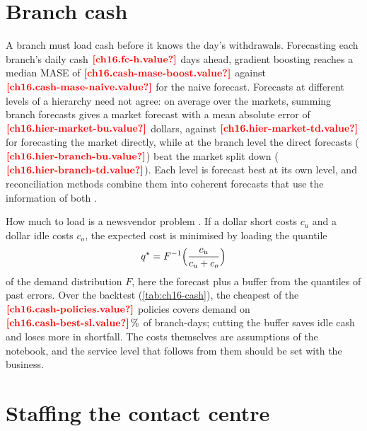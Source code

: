 \section{Branch cash}\label{sec:op-cash}

A branch must load cash before it knows the day's withdrawals. Forecasting each branch's daily cash $\est{ch16.fc-h}{value}$ days ahead,
gradient boosting reaches a median MASE of $\est{ch16.cash-mase-boost}{value}$ against $\est{ch16.cash-mase-naive}{value}$ for
the naive forecast. Forecasts at different levels of a hierarchy need not agree: on average over the markets, summing branch forecasts gives a market forecast with a mean absolute error of $\est{ch16.hier-market-bu}{value}$ dollars, against $\est{ch16.hier-market-td}{value}$ for
forecasting the market directly, while at the branch level the direct forecasts ($\est{ch16.hier-branch-bu}{value}$) beat the
market split down ($\est{ch16.hier-branch-td}{value}$). Each level is forecast best at its own level, and reconciliation methods
combine them into coherent forecasts that use the information of both \autocite{hyndman2011,wickramasuriya2019}.

How much to load is a newsvendor problem \autocite{arrow1951}. If a dollar short costs $c_u$ and a dollar idle costs $c_o$, the
expected cost is minimised by loading the quantile
\begin{equation}\label{eq:op-newsvendor}
  q^{\star} = F^{-1}\Bigl(\frac{c_u}{c_u + c_o}\Bigr)
\end{equation}
of the demand distribution $F$, here the forecast plus a buffer from the quantiles of past errors. Over the backtest
(\cref{tab:ch16-cash}), the cheapest of the $\est{ch16.cash-policies}{value}$ policies covers demand on
$\est{ch16.cash-best-sl}{value}\,\%$ of branch-days; cutting the buffer saves idle cash and loses more in shortfall. The costs
themselves are assumptions of the notebook, and the service level that follows from them should be set with the business.



\section{Staffing the contact centre}\label{sec:op-erlang}

